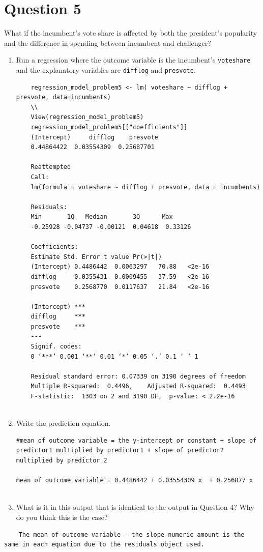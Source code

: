 \documentclass[12pt,letterpaper]{article}
\begin{document}
\section*{Question 5}%
\noindent What if the incumbent's vote share is affected by both the president's popularity and the difference in spending between incumbent and challenger? 
\begin{enumerate}
\item Run a regression where the outcome variable is the incumbent's \texttt{voteshare} and the explanatory variables are \texttt{difflog} and \texttt{presvote}.	
\begin{verbatim}
	regression_model_problem5 <- lm( voteshare ~ difflog + presvote, data=incumbents)
	\\
	View(regression_model_problem5)
	regression_model_problem5[["coefficients"]]
	(Intercept)     difflog    presvote 
	0.44864422  0.03554309  0.25687701 
	
	Reattempted
	Call:
	lm(formula = voteshare ~ difflog + presvote, data = incumbents)
	
	Residuals:
	Min       1Q   Median       3Q      Max 
	-0.25928 -0.04737 -0.00121  0.04618  0.33126 
	
	Coefficients:
	Estimate Std. Error t value Pr(>|t|)
	(Intercept) 0.4486442  0.0063297   70.88   <2e-16
	difflog     0.0355431  0.0009455   37.59   <2e-16
	presvote    0.2568770  0.0117637   21.84   <2e-16
	
	(Intercept) ***
	difflog     ***
	presvote    ***
	---
	Signif. codes:  
	0 ‘***’ 0.001 ‘**’ 0.01 ‘*’ 0.05 ‘.’ 0.1 ‘ ’ 1
	
	Residual standard error: 0.07339 on 3190 degrees of freedom
	Multiple R-squared:  0.4496,	Adjusted R-squared:  0.4493 
	F-statistic:  1303 on 2 and 3190 DF,  p-value: < 2.2e-16
	
\end{verbatim}
\item Write the prediction equation.	
\begin{verbatim}
#mean of outcome variable = the y-intercept or constant + slope of predictor1 multiplied by predictor1 + slope of predictor2 multiplied by predictor 2

mean of outcome variable = 0.4486442 + 0.03554309 x  + 0.256877 x 


\end{verbatim}
\item What is it in this output that is identical to the output in Question 4? Why do you think this is the case?%

 
\end{enumerate}
\begin{verbatim}
	The mean of outcome variable - the slope numeric amount is the same in each equation due to the residuals object used.
\end{verbatim}
\end{document}
